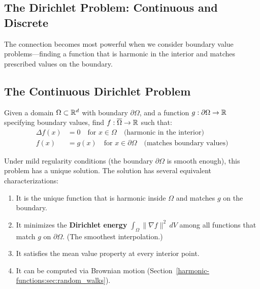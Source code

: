 \begin{notechapter}
\section{The Dirichlet Problem: Continuous and Discrete}
\label{harmonic-functions:sec:dirichlet}

The connection becomes most powerful when we consider boundary value
problems---finding a function that is harmonic in the interior and matches
prescribed values on the boundary.

\subsection{The Continuous Dirichlet Problem}

\begin{definition}
\label{harmonic-functions:def:cont_dirichlet}
Given a domain $\Omega \subset \mathbb{R}^d$ with boundary $\partial\Omega$, and a
function $g : \partial\Omega \to \mathbb{R}$ specifying boundary values, find
$f : \overline{\Omega} \to \mathbb{R}$ such that:
\begin{align}
\Delta f(x) &= 0 \quad \text{for } x \in \Omega
  \quad\text{(harmonic in the interior)} \\
f(x) &= g(x) \quad \text{for } x \in \partial\Omega
  \quad\text{(matches boundary values)}
\end{align}
\end{definition}

Under mild regularity conditions (the boundary $\partial\Omega$ is smooth
enough), this problem has a unique solution. The solution has several
equivalent characterizations:
\begin{enumerate}
    \item It is the unique function that is harmonic inside $\Omega$ and
          matches $g$ on the boundary.
    \item It minimizes the \textbf{Dirichlet energy}
          $\int_\Omega \|\nabla f\|^2\,dV$ among all functions that match
          $g$ on $\partial\Omega$. (The smoothest interpolation.)
    \item It satisfies the mean value property at every interior point.
    \item It can be computed via Brownian motion
          (Section~\ref{harmonic-functions:sec:random_walks}).
\end{enumerate}


\end{notechapter}
